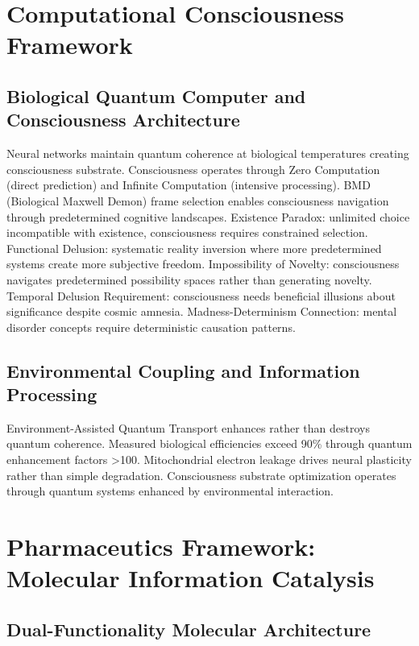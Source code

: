\documentclass[12pt,a4paper]{article}
\begin{document}
\section{Computational Consciousness Framework}

\subsection{Biological Quantum Computer and Consciousness Architecture}

Neural networks maintain quantum coherence at biological temperatures creating consciousness substrate. Consciousness operates through Zero Computation (direct prediction) and Infinite Computation (intensive processing). BMD (Biological Maxwell Demon) frame selection enables consciousness navigation through predetermined cognitive landscapes. Existence Paradox: unlimited choice incompatible with existence, consciousness requires constrained selection. Functional Delusion: systematic reality inversion where more predetermined systems create more subjective freedom. Impossibility of Novelty: consciousness navigates predetermined possibility spaces rather than generating novelty. Temporal Delusion Requirement: consciousness needs beneficial illusions about significance despite cosmic amnesia. Madness-Determinism Connection: mental disorder concepts require deterministic causation patterns.

\subsection{Environmental Coupling and Information Processing}

Environment-Assisted Quantum Transport enhances rather than destroys quantum coherence. Measured biological efficiencies exceed 90\% through quantum enhancement factors >100. Mitochondrial electron leakage drives neural plasticity rather than simple degradation. Consciousness substrate optimization operates through quantum systems enhanced by environmental interaction.

\section{Pharmaceutics Framework: Molecular Information Catalysis}

\subsection{Dual-Functionality Molecular Architecture}
\end{document}
